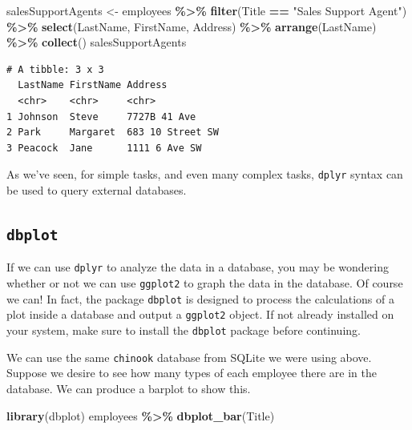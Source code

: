 \documentclass[
]{krantz}
\makeatletter
\newenvironment{Shaded}{\begin{snugshade}}{\end{snugshade}}
\newcommand{\KeywordTok}[1]{\textcolor[rgb]{0.27,0.27,0.27}{\textbf{#1}}}
\newcommand{\NormalTok}[1]{#1}
\newcommand{\OperatorTok}[1]{\textcolor[rgb]{0.43,0.43,0.43}{\textbf{#1}}}
\newcommand{\StringTok}[1]{\textcolor[rgb]{0.5,0.5,0.5}{#1}}
\newenvironment{kframe}{%
\medskip{}
\setlength{\fboxsep}{.8em}
 \def\at@end@of@kframe{}%
 \ifinner\ifhmode%
  \def\at@end@of@kframe{\end{minipage}}%
  \begin{minipage}{\columnwidth}%
 \fi\fi%
 \def\FrameCommand##1{\hskip\@totalleftmargin \hskip-\fboxsep
 \colorbox{shadecolor}{##1}\hskip-\fboxsep
     \hskip-\linewidth \hskip-\@totalleftmargin \hskip\columnwidth}%
 \MakeFramed {\advance\hsize-\width
   \@totalleftmargin\z@ \linewidth\hsize
   \@setminipage}}%
 {\par\unskip\endMakeFramed%
 \at@end@of@kframe}
\renewenvironment{Shaded}{\begin{kframe}}{\end{kframe}}
\makeatother
\begin{document}
\begin{Shaded}
\begin{Highlighting}[]
\NormalTok{salesSupportAgents \textless{}{-}}\StringTok{ }\NormalTok{employees }\OperatorTok{\%\textgreater{}\%}\StringTok{ }
\StringTok{  }\KeywordTok{filter}\NormalTok{(Title }\OperatorTok{==}\StringTok{ "Sales Support Agent"}\NormalTok{) }\OperatorTok{\%\textgreater{}\%}\StringTok{ }
\StringTok{  }\KeywordTok{select}\NormalTok{(LastName, FirstName, Address) }\OperatorTok{\%\textgreater{}\%}\StringTok{ }
\StringTok{  }\KeywordTok{arrange}\NormalTok{(LastName) }\OperatorTok{\%\textgreater{}\%}\StringTok{ }
\StringTok{  }\KeywordTok{collect}\NormalTok{()}
\NormalTok{salesSupportAgents}
\end{Highlighting}
\end{Shaded}

\begin{verbatim}
# A tibble: 3 x 3
  LastName FirstName Address         
  <chr>    <chr>     <chr>           
1 Johnson  Steve     7727B 41 Ave    
2 Park     Margaret  683 10 Street SW
3 Peacock  Jane      1111 6 Ave SW   
\end{verbatim}

As we've seen, for simple tasks, and even many complex tasks, \texttt{dplyr} syntax can be used to query external databases.

\hypertarget{dbplot}{%
\subsection{\texorpdfstring{\texttt{dbplot}}{dbplot}}\label{dbplot}}

If we can use \texttt{dplyr} to analyze the data in a database, you may be wondering whether or not we can use \texttt{ggplot2} to graph the data in the database. Of course we can! In fact, the package \texttt{dbplot} is designed to process the calculations of a plot inside a database and output a \texttt{ggplot2} object. If not already installed on your system, make sure to install the \texttt{dbplot} package before continuing.

We can use the same \texttt{chinook} database from SQLite we were using above. Suppose we desire to see how many types of each employee there are in the database. We can produce a barplot to show this.

\begin{Shaded}
\begin{Highlighting}[]
\KeywordTok{library}\NormalTok{(dbplot)}
\NormalTok{employees }\OperatorTok{\%\textgreater{}\%}\StringTok{ }
\StringTok{  }\KeywordTok{dbplot\_bar}\NormalTok{(Title)}
\end{Highlighting}
\end{Shaded}
\end{document}
